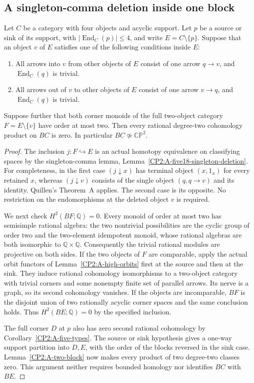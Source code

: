 \subsection{A singleton-comma deletion inside one block}

\begin{proposition}[Proved]\label{CP2:A-singleton-deletion-block-cut}
Let $C$ be a category with four objects and acyclic support.
Let $p$ be a source or sink of its support, with
$|\operatorname{End}_C(p)|\leq4$, and write
$E=C\setminus\{p\}$. Suppose that an object $v$ of $E$
satisfies one of the following conditions inside $E$:
\begin{enumerate}
\item All arrows into $v$ from other objects of $E$ consist
of one arrow $q\to v$, and $\operatorname{End}_C(q)$ is trivial.
\item All arrows out of $v$ to other objects of $E$ consist
of one arrow $v\to q$, and $\operatorname{End}_C(q)$ is trivial.
\end{enumerate}
Suppose further that both corner monoids of the full
two-object category $F=E\setminus\{v\}$ have order at most
two. Then every rational degree-two cohomology product on
$BC$ is zero. In particular $BC\not\simeq\mathbb{CP}^2$.
\end{proposition}
\begin{proof}
The inclusion $j:F\hookrightarrow E$ is an actual homotopy
equivalence on classifying spaces by the singleton-comma
lemma, Lemma~\ref{CP2:A-five18-singleton-deletion}.
For completeness, in the first case $(j\downarrow x)$
has terminal object $(x,1_x)$ for every retained $x$,
whereas $(j\downarrow v)$ consists of the single object
$(q,q\to v)$ and its identity. Quillen's Theorem~A applies.
The second case is its opposite. No restriction on the
endomorphisms at the deleted object $v$ is required.

We next check $H^2(BF;\mathbb Q)=0$. Every monoid of
order at most two has semisimple rational algebra: the
two nontrivial possibilities are the cyclic group of order
two and the two-element idempotent monoid, whose rational
algebras are both isomorphic to $\mathbb Q\times\mathbb Q$.
Consequently the trivial rational modules are projective
on both sides. If the two objects of $F$ are comparable,
apply the actual orbit functors of
Lemma~\ref{CP2:A-high-orbits} first at the source and then
at the sink. They induce rational cohomology isomorphisms
to a two-object category with trivial corners and some
nonempty finite set of parallel arrows. Its nerve is a
graph, so its second cohomology vanishes. If the objects
are incomparable, $BF$ is the disjoint union of two
rationally acyclic corner spaces and the same conclusion
holds. Thus $H^2(BE;\mathbb Q)=0$ by the specified inclusion.

The full corner $D$ at $p$ also has zero second rational
cohomology by Corollary~\ref{CP2:A-five-types}. The source
or sink hypothesis gives a one-way support partition into
$D,E$, with the order of the blocks reversed in the sink
case. Lemma~\ref{CP2:A-two-block} now makes every product
of two degree-two classes zero. This argument neither
requires bounded homology nor identifies $BC$ with $BE$.
\end{proof}

